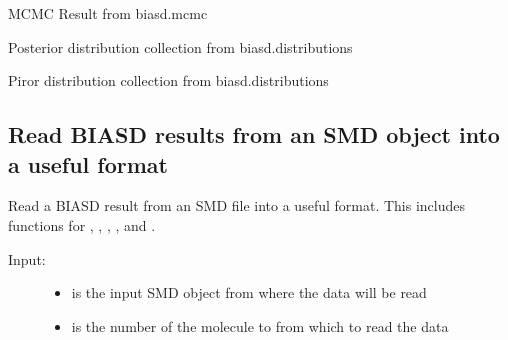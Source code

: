 \documentclass[letterpaper,10pt,english]{sphinxmanual}
\begin{document}

\begin{fulllineitems}
\label{code_smd:smd.add.mcmc}
MCMC Result from biasd.mcmc

\end{fulllineitems}


\begin{fulllineitems}
\label{code_smd:smd.add.posterior}
Posterior distribution collection from biasd.distributions

\end{fulllineitems}


\begin{fulllineitems}
\label{code_smd:smd.add.priors}
Piror distribution collection from biasd.distributions

\end{fulllineitems}



\subsection{Read BIASD results from an SMD object into a useful format}
\label{code_smd:read-biasd-results-from-an-smd-object-into-a-useful-format}\label{code_smd:module-smd.read}
Read a BIASD result from an SMD file into a useful format. This includes functions for , , , , and .
\begin{description}
\item[{Input:}] \leavevmode\begin{itemize}
\item {} 
 is the input SMD object from where the data will be read

\item {} 
 is the number of the molecule to from which to read the data

\end{itemize}

\end{description}
\end{document}
